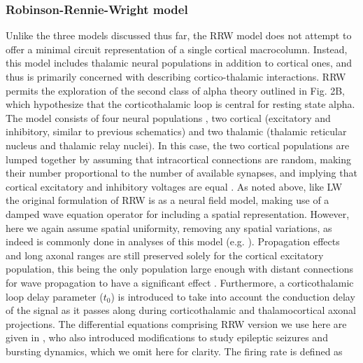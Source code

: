 \documentclass[12pt,twoside]{article}
\begin{document}
\subsubsection{Robinson-Rennie-Wright model}

Unlike the three models discussed thus far, the RRW model does not attempt to offer a minimal circuit representation of a single cortical macrocolumn. Instead, this model includes thalamic neural populations in addition to cortical ones, and thus is primarily concerned with describing cortico-thalamic interactions. RRW permits the exploration of the second class of alpha theory outlined in Fig. 2B, which hypothesize that the corticothalamic loop is central for resting state alpha. The model consists of four neural populations \citep{robinson2002dynamics}, two cortical (excitatory and inhibitory, similar to previous schematics) and two thalamic (thalamic reticular nucleus and thalamic relay nuclei). In this case, the two cortical populations are lumped together by assuming that intracortical connections are random, making their number proportional to the number of available synapses, and implying that cortical excitatory and inhibitory voltages are equal \citep{roberts2012corticothalamic}. As noted above, like LW the original formulation of RRW is as a neural field model, making use of a damped wave equation operator for including a spatial representation. However, here we again assume spatial uniformity, removing any spatial variations, as indeed is commonly done in analyses of this model (e.g. \citealp{robinson2002dynamics, robinson2003neurophysical, van2010neurophysiological, abeysuriya2014prediction, abeysuriya2015physiologically}). Propagation effects and long axonal ranges are still preserved solely for the cortical excitatory population, this being the only population large enough with distant connections for wave propagation to have a significant effect \citep{zhao2015slow}. 
Furthermore, a corticothalamic loop delay parameter ($t_0$) is introduced to take into account the conduction delay of the signal as it passes along during corticothalamic and thalamocortical axonal projections.
The differential equations comprising RRW version we use here are given in \citet{zhao2015generalized}, who also introduced modifications to study epileptic seizures and bursting dynamics, which we omit here for clarity. The firing rate is defined as 
\end{document}
